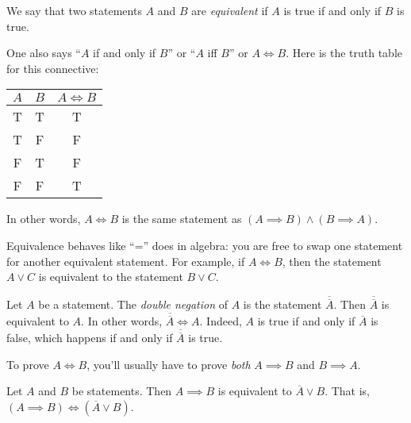 \documentclass[11pt,dvipsnames]{book}
\numberwithin{figure}{section} %
\numberwithin{table}{section} %
\begin{document}
\begin{definition}
    We say that two statements $A$ and $B$ are \emph{equivalent} if $A$ is true if and only if $B$ is true.
\end{definition}

One also says ``$A$ if and only if $B$'' or ``$A$ iff $B$'' or $A \iff B$.
Here is the truth table for this connective:
\begin{center}
    \begin{tabular}{ c|c|c}
        $A$ & $B$ & $A \iff B$  \\ \hline
        T & T & T \\
        T & F & F \\
        F & T & F \\
        F & F & T \\
    \end{tabular}
\end{center}

In other words, $A \iff B$ is the same statement as $(A\implies B) \wedge (B \implies A)$.

Equivalence behaves like ``='' does in algebra: you are free to swap one statement for another equivalent statement.
For example, if $A\iff B$, then the statement $A \vee C$ is equivalent to the statement $B \vee C$.

\begin{example}
Let $A$ be a statement.
The \emph{double negation} of $A$ is the statement $\overline{\overline{A}}$.
Then $\overline{\overline{A}}$ is equivalent to $A$.
In other words, $\overline{\overline{A}} \iff A$.
Indeed, $A$ is true if and only if $\overline{A}$ is false, which happens if and only if $\overline{\overline{A}}$ is true.
\end{example}

To prove $A\iff B$, you'll usually have to prove \emph{both} $A\implies B$ and $B\implies A$.

\begin{theorem}
Let $A$ and $B$ be statements.
Then $A \implies B$ is equivalent to $\overline{A} \vee B$.
That is, $(A \implies B) \iff (\overline{A} \vee B)$.
\end{theorem}
\end{document}
